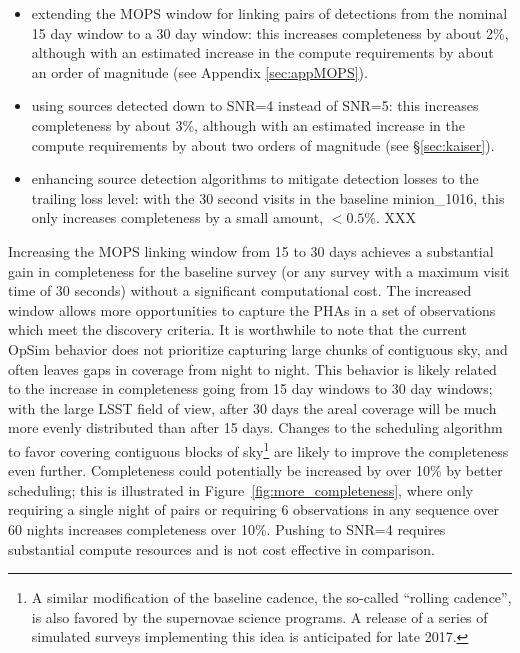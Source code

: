 \begin{itemize}
\item extending the MOPS window for linking pairs of detections from the nominal 15 day window to a 30 day window: this increases completeness by about 2\%, although with an estimated increase in the compute requirements by about an order of magnitude (see Appendix \ref{sec:appMOPS}).
\item using sources detected down to SNR=4 instead of SNR=5: this increases completeness by about 3\%, although with an estimated increase in the compute requirements by about two orders of magnitude (see \S\ref{sec:kaiser}).
\item enhancing source detection algorithms to mitigate detection losses to the trailing loss level: with the 30 second visits in the baseline minion\_1016, this only increases completeness by a small amount, $<0.5$\%. XXX
\end{itemize}

Increasing the MOPS linking window from 15 to 30 days achieves a substantial gain in completeness for the baseline survey
(or any survey with a maximum visit time of 30 seconds) without a significant computational cost. The increased window allows more opportunities to capture the PHAs in a set of observations which meet the discovery criteria. It is worthwhile to note that the current OpSim behavior does not prioritize capturing large chunks of contiguous sky, and often leaves gaps in coverage from night to night. This behavior is likely related to the increase in completeness going from 15 day windows to 30 day windows; with the large LSST field of view, after 30 days the areal coverage will be much more evenly distributed than after 15 days. Changes to the scheduling algorithm to favor covering contiguous blocks of sky\footnote{A similar modification of
the baseline cadence, the so-called ``rolling cadence'', is also favored by the supernovae science programs. A release of a series of simulated surveys implementing this idea is anticipated for late 2017.} are likely to improve the completeness even further. Completeness could potentially be increased by over 10\% by better scheduling; this is illustrated in Figure~\ref{fig:more_completeness}, where only requiring a single night of pairs or requiring 6 observations in any sequence over 60 nights increases completeness over 10\%.  Pushing to SNR=4 requires substantial
compute resources and is not cost effective in comparison.


